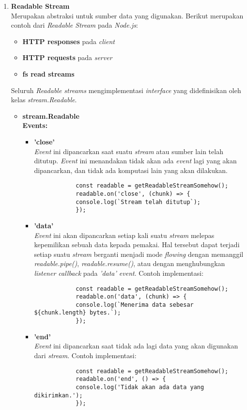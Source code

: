 \begin{enumerate}
	\item \textbf{Readable Stream} \\
	Merupakan abstraksi untuk sumber data yang digunakan. Berikut merupakan contoh dari \textit{Readable Stream} pada \textit{Node.js}:
	\begin{itemize}
		\item \textbf{HTTP responses} pada \textit{client}
		\item \textbf{HTTP requests} pada \textit{server}
		\item \textbf{fs read streams}
	\end{itemize}
	Seluruh \textit{Readable streams} mengimplementasi \textit{interface} yang didefinisikan oleh kelas \textit{stream.Readable}.
	
	\begin{itemize}
		\item \textbf{stream.Readable} \\
		\textbf{Events:}
		\begin{itemize}
			\item \textbf{'close'} \\ \textit{Event} ini dipancarkan saat suatu \textit{stream} atau sumber lain telah ditutup. \textit{Event} ini menandakan tidak akan ada \textit{event} lagi yang akan dipancarkan, dan tidak ada komputasi lain yang akan dilakukan.
			\begin{lstlisting}
			const readable = getReadableStreamSomehow();
			readable.on('close', (chunk) => {
			console.log(`Stream telah ditutup`);
			});
			\end{lstlisting}
			
			\item \textbf{'data'} \\ \textit{Event} ini akan dipancarkan setiap kali suatu \textit{stream} melepas kepemilikan sebuah data kepada pemakai. Hal tersebut dapat terjadi setiap suatu \textit{stream} berganti menjadi mode \textit{flowing} dengan memanggil \textit{readable.pipe()}, \textit{readable.resume()}, atau dengan menghubungkan \textit{listener callback} pada \textit{'data' event}. Contoh implementasi:
			\begin{lstlisting}
			const readable = getReadableStreamSomehow();
			readable.on('data', (chunk) => {
			console.log(`Menerima data sebesar ${chunk.length} bytes.`);
			});
			\end{lstlisting}
			
			\item \textbf{'end'} \\ \textit{Event} ini dipancarkan saat tidak ada lagi data yang akan digunakan dari \textit{stream}. Contoh implementasi:
			\begin{lstlisting}
			const readable = getReadableStreamSomehow();
			readable.on('end', () => {
			console.log('Tidak akan ada data yang dikirimkan.');
			});
			\end{lstlisting}
			

\end{itemize}
\end{itemize}
\end{enumerate}
